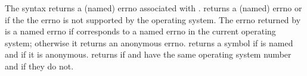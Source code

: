 \begin{protos}
\end{protos}
\noindent
The syntax  returns a (named) errno associated with
.
 returns a (named) errno or  if the
 the errno  is not supported by the operating system.
The errno returned by  is a named errno if
  corresponds to a named errno in the current operating
 system; otherwise it returns an anonymous errno.
 returns a symbol if  is named and
  if it is anonymous. 
 returns  if  and 
 have the same operating system number and  if they do not.

